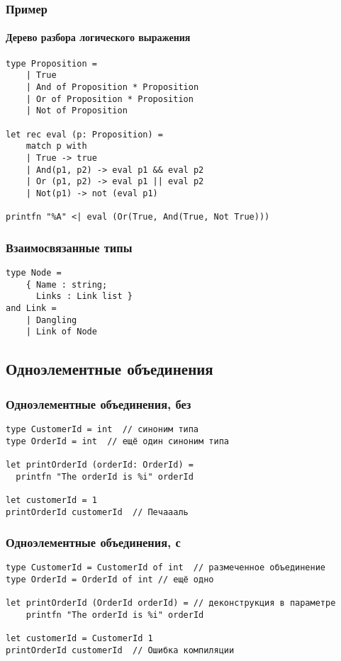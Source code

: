 \documentclass[xetex,mathserif,serif]{beamer}
\begin{document}
	\begin{frame}[fragile]
		\frametitle{Пример}
		\framesubtitle{Дерево разбора логического выражения}
		\begin{verbatim}
type Proposition =
    | True
    | And of Proposition * Proposition
    | Or of Proposition * Proposition
    | Not of Proposition

let rec eval (p: Proposition) =
    match p with
    | True -> true
    | And(p1, p2) -> eval p1 && eval p2
    | Or (p1, p2) -> eval p1 || eval p2
    | Not(p1) -> not (eval p1)

printfn "%A" <| eval (Or(True, And(True, Not True)))
		\end{verbatim}
	\end{frame}

	\begin{frame}[fragile]
		\frametitle{Взаимосвязанные типы}
		\begin{verbatim}
type Node =
    { Name : string;
      Links : Link list }
and Link =
    | Dangling
    | Link of Node
		\end{verbatim}
	\end{frame}

	\subsection{Одноэлементные объединения}

	\begin{frame}[fragile]
		\frametitle{Одноэлементные объединения, без}
		\begin{verbatim}
type CustomerId = int  // синоним типа
type OrderId = int  // ещё один синоним типа

let printOrderId (orderId: OrderId) =
  printfn "The orderId is %i" orderId

let customerId = 1  
printOrderId customerId  // Печаааль
		\end{verbatim}
	\end{frame}

	\begin{frame}[fragile]
		\frametitle{Одноэлементные объединения, с}
		\begin{verbatim}
type CustomerId = CustomerId of int  // размеченное объединение 
type OrderId = OrderId of int // ещё одно

let printOrderId (OrderId orderId) = // деконструкция в параметре
    printfn "The orderId is %i" orderId

let customerId = CustomerId 1
printOrderId customerId  // Ошибка компиляции
		\end{verbatim}
	\end{frame}
\end{document}
